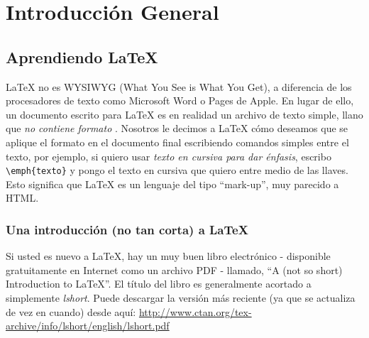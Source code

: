 
\chapter{Introducción General} %

\label{Chapter1} %
\label{IntroGeneral}


\newcommand{\keyword}[1]{\textbf{#1}}
\newcommand{\tabhead}[1]{\textbf{#1}}
\newcommand{\code}[1]{\texttt{#1}}
\newcommand{\file}[1]{\texttt{\bfseries#1}}
\newcommand{\option}[1]{\texttt{\itshape#1}}
\newcommand{\grados}{$^{\circ}$}



\section{Aprendiendo \LaTeX{}}

\LaTeX{} no es \textsc{WYSIWYG} (What You See is What You Get), a diferencia de los procesadores de texto como Microsoft Word o Pages de Apple. En lugar de ello, un documento escrito para \LaTeX{} es en realidad un archivo de texto simple, llano que \emph{no contiene formato} . Nosotros le decimos a \LaTeX{} cómo deseamos que se aplique el formato en el documento final escribiendo comandos simples entre el texto, por ejemplo, si quiero usar \emph{texto en cursiva para dar énfasis}, escribo \verb|\emph{texto}| y pongo el texto en cursiva que quiero entre medio de las llaves. Esto significa que \LaTeX{} es un lenguaje del tipo \enquote{mark-up}, muy parecido a HTML.

\subsection{Una introducción (no tan corta) a \LaTeX{}}

Si usted es nuevo a \LaTeX{}, hay un muy buen libro electrónico - disponible gratuitamente en Internet como un archivo PDF - llamado, \enquote{A (not so short) Introduction to \LaTeX{}}. El título del libro es generalmente acortado a simplemente \emph{lshort}. Puede descargar la versión más reciente (ya que se actualiza de vez en cuando) desde aquí:
\url{http://www.ctan.org/tex-archive/info/lshort/english/lshort.pdf}

